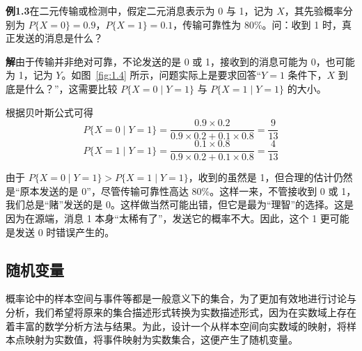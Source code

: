 \documentclass[11pt,openany,UTF8]{ctexbook}
\begin{document}
\begin{examplebox}
\textbf{例1.3}\quad 在二元传输或检测中\nobreak，假定二元消息表示为 0 与 1\nobreak，记为 $X$\nobreak，其先验概率分别为 $P\{X=0\}=0.9$\nobreak，$P\{X=1\}=0.1$\nobreak，传输可靠性为 80\%\nobreak。问\nobreak：收到 1 时\nobreak，真正发送的消息是什么\nobreak？

\textbf{解}\quad 由于传输并非绝对可靠\nobreak，不论发送的是 0 或 1\nobreak，接收到的消息可能为 0\nobreak，也可能为 1\nobreak，记为 $Y$\nobreak。如图~\ref{fig:1.4} 所示\nobreak，问题实际上是要求回答“$Y=1$ 条件下\nobreak，$X$ 到底是什么\nobreak？”\nobreak，这需要比较 $P\{X=0\mid Y=1\}$ 与 $P\{X=1\mid Y=1\}$ 的大小\nobreak。

根据贝叶斯公式可得
\[
P\{X=0\mid Y=1\}=\frac{0.9\times 0.2}{0.9\times 0.2+0.1\times 0.8}=\frac{9}{13}
\]
\[
P\{X=1\mid Y=1\}=\frac{0.1\times 0.8}{0.9\times 0.2+0.1\times 0.8}=\frac{4}{13}
\]

\begin{center}

  \smallskip
  \label{fig:1.4}
\end{center}

由于 $P\{X=0\mid Y=1\}>P\{X=1\mid Y=1\}$\nobreak，收到的虽然是 1\nobreak，但合理的估计仍然是“原本发送的是 0”\nobreak，尽管传输可靠性高达 80\%\nobreak。这样一来\nobreak，不管接收到 0 或 1\nobreak，我们总是“赌”发送的是 0\nobreak。这样做当然可能出错\nobreak，但它是最为“理智”的选择\nobreak。这是因为在源端\nobreak，消息 1 本身“太稀有了”\nobreak，发送它的概率不大\nobreak。因此\nobreak，这个 1 更可能是发送 0 时错误产生的\nobreak。
\end{examplebox}

\subsection{随机变量}
概率论中的样本空间与事件等都是一般意义下的集合\nobreak，为了更加有效地进行讨论与分析\nobreak，我们希望将原来的集合描述形式转换为实数描述形式\nobreak，因为在实数域上存在着丰富的数学分析方法与结果\nobreak。为此\nobreak，设计一个从样本空间向实数域的映射\nobreak，将样本点映射为实数值\nobreak，将事件映射为实数集合\nobreak，这便产生了随机变量\nobreak。
\end{document}

